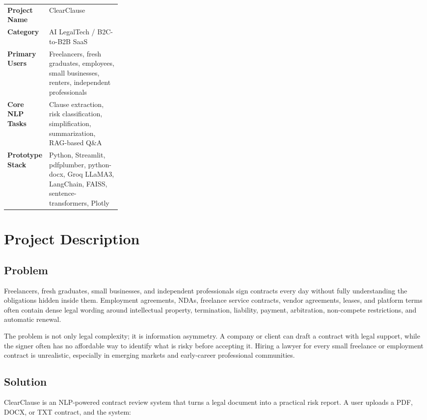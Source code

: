 \documentclass[11pt,a4paper]{article}
\begin{document}
\begin{tabularx}{\linewidth}{L{0.27\linewidth}Y}
\toprule
\textbf{Project Name} & ClearClause \\
\textbf{Category} & AI LegalTech / B2C-to-B2B SaaS \\
\textbf{Primary Users} & Freelancers, fresh graduates, employees, small businesses, renters, independent professionals \\
\textbf{Core NLP Tasks} & Clause extraction, risk classification, simplification, summarization, RAG-based Q\&A \\
\textbf{Prototype Stack} & Python, Streamlit, pdfplumber, python-docx, Groq LLaMA3, LangChain, FAISS, sentence-transformers, Plotly \\
\bottomrule
\end{tabularx}

\section{Project Description}

\subsection{Problem}

Freelancers, fresh graduates, small businesses, and independent professionals sign contracts every day without fully understanding the obligations hidden inside them. Employment agreements, NDAs, freelance service contracts, vendor agreements, leases, and platform terms often contain dense legal wording around intellectual property, termination, liability, payment, arbitration, non-compete restrictions, and automatic renewal.

The problem is not only legal complexity; it is information asymmetry. A company or client can draft a contract with legal support, while the signer often has no affordable way to identify what is risky before accepting it. Hiring a lawyer for every small freelance or employment contract is unrealistic, especially in emerging markets and early-career professional communities.

\subsection{Solution}

ClearClause is an NLP-powered contract review system that turns a legal document into a practical risk report. A user uploads a PDF, DOCX, or TXT contract, and the system:
\end{document}
